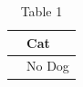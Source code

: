 \documentclass[11pt,a4paper]{article}
\begin{document}
\begin{table}[h]
\caption{Table 1}
\begin{tabular}{|l|l|}
\hline
 & Cat \\ \hline
 & No Dog \\ \hline
\end{tabular}
\end{table}
\end{document}

